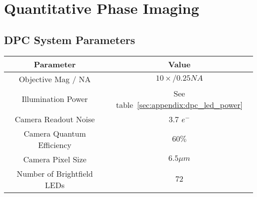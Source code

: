 \section{Quantitative Phase Imaging}\label{sec:appendix:phase}

\subsection{DPC System Parameters}\label{sec:appendix:dpc_sys_param}
\begin{center}
    \begin{tabular}{ | c | c |}
    \hline
    \textbf{Parameter} & \textbf{Value} \\
    \hline
    Objective Mag / NA& $10\times / 0.25NA$\\
    \hline
    Illumination Power & See table~\ref{sec:appendix:dpc_led_power}\\
    \hline
    Camera Readout Noise & 3.7 $e^-$ \\
    \hline
    Camera Quantum Efficiency & $60\%$ \\
    \hline
    Camera Pixel Size & $6.5\mu m$\\
    \hline
    Number of Brightfield LEDs & $72$\\
    \hline
    \end{tabular}
\end{center}


